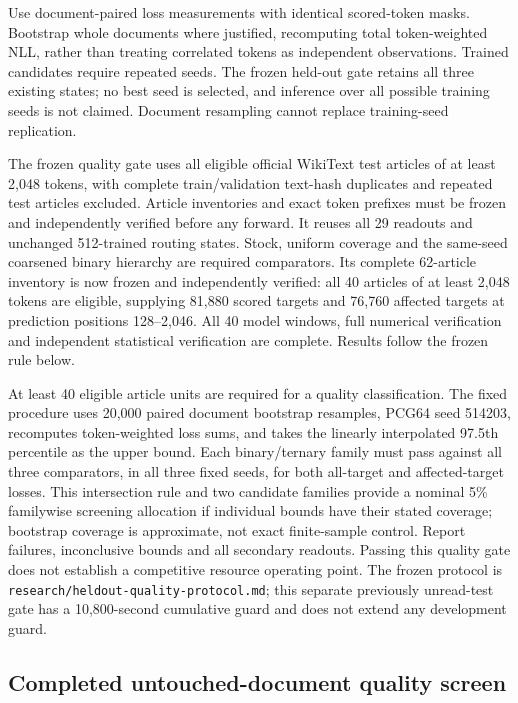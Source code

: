 \documentclass[11pt]{article}
\begin{document}
Use document-paired loss measurements with identical scored-token masks.
Bootstrap whole documents where justified, recomputing total token-weighted
NLL, rather than treating correlated tokens as independent observations.
Trained candidates require repeated seeds. The frozen held-out gate retains
all three existing states; no best seed is selected, and inference over all
possible training seeds is not claimed. Document resampling cannot replace
training-seed replication.

The frozen quality gate uses all eligible official WikiText test articles
of at least 2,048 tokens, with complete train/validation text-hash duplicates
and repeated test articles excluded. Article inventories and exact token
prefixes must be frozen and independently verified before any forward.
It reuses all 29 readouts and unchanged 512-trained routing states. Stock,
uniform coverage and the same-seed coarsened binary hierarchy are required
comparators. Its complete 62-article inventory is now frozen and independently
verified: all 40 articles of at least 2,048 tokens are eligible, supplying
81,880 scored targets and 76,760 affected targets at prediction positions
128--2,046. All 40 model windows, full numerical verification and independent
statistical verification are complete. Results follow the frozen rule below.

At least 40 eligible article units are required for a quality classification.
The fixed procedure uses 20,000 paired document bootstrap resamples, PCG64
seed 514203, recomputes token-weighted loss sums, and takes the linearly
interpolated 97.5th percentile as the upper bound. Each binary/ternary family
must pass against all three comparators, in all three fixed seeds, for both
all-target and affected-target losses. This intersection rule and two candidate
families provide a nominal 5\% familywise screening allocation if individual
bounds have their stated coverage; bootstrap coverage is approximate, not
exact finite-sample control. Report failures, inconclusive bounds and all
secondary readouts. Passing this quality gate does not establish a
competitive resource operating point. The frozen protocol is
\texttt{research/\allowbreak{}heldout-\allowbreak{}quality-\allowbreak{}protocol.\allowbreak{}md}; this separate
previously unread-test gate has a 10,800-second cumulative guard and does not extend
any development guard.

\subsection{Completed untouched-document quality screen}
\label{sec:heldout-results}
\end{document}
